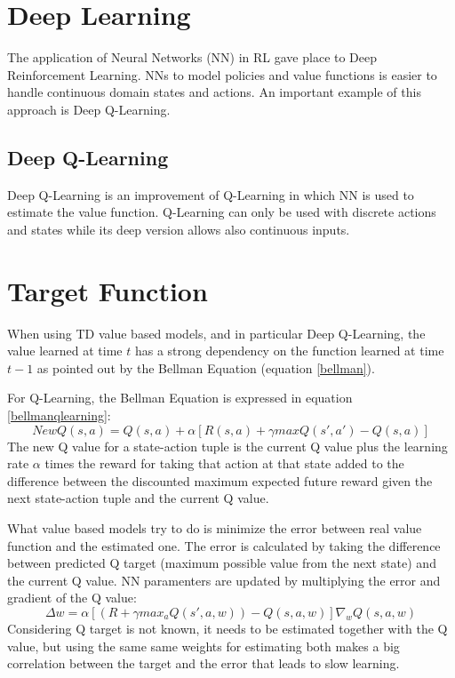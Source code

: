 \documentclass[Lau,oneside,noexaminfo]{sapthesis} %
\begin{document}
\section{Deep Learning}
The application of Neural Networks (NN) in RL gave place to Deep Reinforcement Learning. NNs to model policies and value functions is easier to handle continuous domain states and actions. An important example of this approach is Deep Q-Learning.
\subsection{Deep Q-Learning}
Deep Q-Learning is an improvement of Q-Learning in which NN is used to estimate the value function. Q-Learning can only be used with discrete actions and states while its deep version allows also continuous inputs.
\section{Target Function}
When using TD value based models, and in particular Deep Q-Learning, the value learned at time $t$ has a strong dependency on the function learned at time $t-1$ as pointed out by the Bellman Equation (equation \ref{bellman}).  

For Q-Learning, the Bellman Equation is expressed in equation \ref{bellmanqlearning}:
\begin{equation}
NewQ( s,a ) = Q( s,a ) + \alpha [ R(s,a) + \gamma maxQ(s',a') - Q(s,a) ]
\label{bellmanqlearning}
\end{equation}
The new Q value for a state-action tuple is the current Q value plus the learning rate $\alpha$ times the reward for taking that action at that state added to the difference between the discounted  maximum expected future reward given the next state-action tuple and the current Q value. 

What value based models try to do is minimize the error between real value function and the estimated one. The error is calculated by taking the difference between predicted Q target (maximum possible value from the next state) and the current Q value. NN paramenters are updated by multiplying the error and gradient of the Q value:
\begin{equation}
\Delta w = \alpha [ (R + \gamma max_a Q(s',a,w)) - Q(s,a,w)] \nabla_w Q( s,a,w )
\end{equation}
Considering Q target is not known, it needs to be estimated together with the Q value, but using the same same weights for estimating both makes a big correlation between the target and the error that leads to slow learning. 
\end{document}
